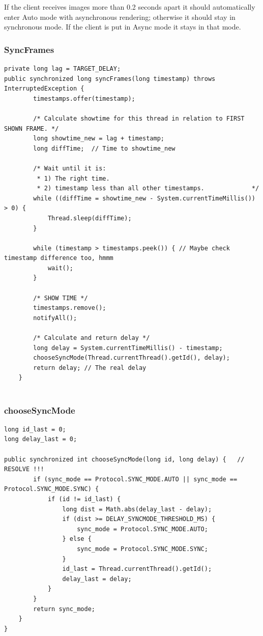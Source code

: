 \documentclass[8pt,titlepage]{article}
\begin{document}
If the client receives images more than 0.2 seconds apart it should automatically enter Auto mode with asynchronous rendering; otherwise it should stay in synchronous mode. If the client is put in Async mode it stays in that mode.

\subsubsection{SyncFrames}
\begin{verbatim}
private long lag = TARGET_DELAY;
public synchronized long syncFrames(long timestamp) throws InterruptedException {
		timestamps.offer(timestamp);

		/* Calculate showtime for this thread in relation to FIRST SHOWN FRAME. */
		long showtime_new = lag + timestamp;				
		long diffTime;	// Time to showtime_new

		/* Wait until it is:
		 * 1) The right time.
		 * 2) timestamp less than all other timestamps.				*/				
		while ((diffTime = showtime_new - System.currentTimeMillis()) > 0) {
			Thread.sleep(diffTime);		
		} 

		while (timestamp > timestamps.peek()) { // Maybe check timestamp difference too, hmmm
			wait();
		}

		/* SHOW TIME */
		timestamps.remove();
		notifyAll();

		/* Calculate and return delay */
		long delay = System.currentTimeMillis() - timestamp;					
		chooseSyncMode(Thread.currentThread().getId(), delay);
		return delay; // The real delay
	}


\end{verbatim}
\subsubsection{chooseSyncMode}
\begin{verbatim}
long id_last = 0;
long delay_last = 0;	

public synchronized int chooseSyncMode(long id, long delay) {	// RESOLVE !!!		
		if (sync_mode == Protocol.SYNC_MODE.AUTO || sync_mode == Protocol.SYNC_MODE.SYNC) {
			if (id != id_last) {
				long dist = Math.abs(delay_last - delay);
				if (dist >= DELAY_SYNCMODE_THRESHOLD_MS) {
					sync_mode = Protocol.SYNC_MODE.AUTO;
				} else {
					sync_mode = Protocol.SYNC_MODE.SYNC;
				}
				id_last = Thread.currentThread().getId();
				delay_last = delay;		
			}
		}
		return sync_mode;
	}
}	
\end{verbatim}
\end{document}
